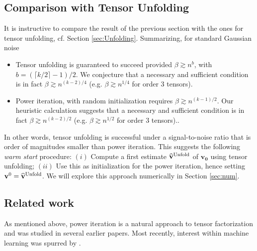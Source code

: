 \documentclass[11pt]{article}
\theoremstyle{definition}
\def\bv{\mathbf{v}}
\def\hbv{\mathbf{\widehat{v}}}
\def\bvz{\mathbf{v_0}}
\begin{document}
\subsection{Comparison with Tensor Unfolding}\label{sec:matriceWarmStart}

It is instructive to compare the result of the previous section 
with the ones for tensor unfolding, cf. Section \ref{sec:Unfolding}.
Summarizing, for standard Gaussian noise
%
\begin{itemize}
%
\item Tensor unfolding is guaranteed to succeed provided $\beta\gtrsim n^{b}$,
with $b = (\lceil k/2\rceil -1)/2$.  We conjecture that a necessary
and sufficient condition is in fact $\beta\gtrsim n^{(k-2)/4}$
(e.g. $\beta\gtrsim n^{1/4}$ for order $3$ tensors).
%
\item Power iteration, with random initialization requires
  $\beta\gtrsim n^{(k-1)/2}$.   Our heuristic calculation suggests
  that a necessary and sufficient condition is in fact $\beta\gtrsim
  n^{(k-2)/2}$
(e.g. $\beta\gtrsim n^{1/2}$ for order $3$ tensors)..
%
\end{itemize}
%

In other words, tensor unfolding is successful 
under a signal-to-noise ratio that is order of magnitudes smaller than
power iteration.
This suggests the following \emph{warm start} procedure:
$(i)$ Compute a first estimate $\hbv^{\rm Unfold}$ of $\bvz$ using tensor
unfolding; $(ii)$ Use this as initialization for the power iteration,
hence setting $\bv^0= \hbv^{\rm Unfold}$. We will explore
this approach numerically in Section \ref{sec:num}.


\subsection{Related work}

As mentioned above, power iteration is a natural approach to tensor factorization
and was studied in several earlier papers.
Most recently, interest within machine learning was spurred by 
\cite{anandkumar12}.
\end{document}
